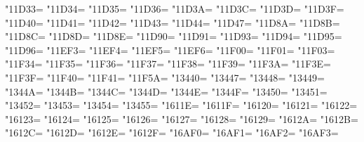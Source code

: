 \XeTeXcharclass"11D33=\KclassCM
\XeTeXcharclass"11D34=\KclassCM
\XeTeXcharclass"11D35=\KclassCM
\XeTeXcharclass"11D36=\KclassCM
\XeTeXcharclass"11D3A=\KclassCM
\XeTeXcharclass"11D3C=\KclassCM
\XeTeXcharclass"11D3D=\KclassCM
\XeTeXcharclass"11D3F=\KclassCM
\XeTeXcharclass"11D40=\KclassCM
\XeTeXcharclass"11D41=\KclassCM
\XeTeXcharclass"11D42=\KclassCM
\XeTeXcharclass"11D43=\KclassCM
\XeTeXcharclass"11D44=\KclassCM
\XeTeXcharclass"11D47=\KclassCM
\XeTeXcharclass"11D8A=\KclassCM
\XeTeXcharclass"11D8B=\KclassCM
\XeTeXcharclass"11D8C=\KclassCM
\XeTeXcharclass"11D8D=\KclassCM
\XeTeXcharclass"11D8E=\KclassCM
\XeTeXcharclass"11D90=\KclassCM
\XeTeXcharclass"11D91=\KclassCM
\XeTeXcharclass"11D93=\KclassCM
\XeTeXcharclass"11D94=\KclassCM
\XeTeXcharclass"11D95=\KclassCM
\XeTeXcharclass"11D96=\KclassCM
\XeTeXcharclass"11EF3=\KclassCM
\XeTeXcharclass"11EF4=\KclassCM
\XeTeXcharclass"11EF5=\KclassCM
\XeTeXcharclass"11EF6=\KclassCM
\XeTeXcharclass"11F00=\KclassCM
\XeTeXcharclass"11F01=\KclassCM
\XeTeXcharclass"11F03=\KclassCM
\XeTeXcharclass"11F34=\KclassCM
\XeTeXcharclass"11F35=\KclassCM
\XeTeXcharclass"11F36=\KclassCM
\XeTeXcharclass"11F37=\KclassCM
\XeTeXcharclass"11F38=\KclassCM
\XeTeXcharclass"11F39=\KclassCM
\XeTeXcharclass"11F3A=\KclassCM
\XeTeXcharclass"11F3E=\KclassCM
\XeTeXcharclass"11F3F=\KclassCM
\XeTeXcharclass"11F40=\KclassCM
\XeTeXcharclass"11F41=\KclassCM
\XeTeXcharclass"11F5A=\KclassCM
\XeTeXcharclass"13440=\KclassCM
\XeTeXcharclass"13447=\KclassCM
\XeTeXcharclass"13448=\KclassCM
\XeTeXcharclass"13449=\KclassCM
\XeTeXcharclass"1344A=\KclassCM
\XeTeXcharclass"1344B=\KclassCM
\XeTeXcharclass"1344C=\KclassCM
\XeTeXcharclass"1344D=\KclassCM
\XeTeXcharclass"1344E=\KclassCM
\XeTeXcharclass"1344F=\KclassCM
\XeTeXcharclass"13450=\KclassCM
\XeTeXcharclass"13451=\KclassCM
\XeTeXcharclass"13452=\KclassCM
\XeTeXcharclass"13453=\KclassCM
\XeTeXcharclass"13454=\KclassCM
\XeTeXcharclass"13455=\KclassCM
\XeTeXcharclass"1611E=\KclassCM
\XeTeXcharclass"1611F=\KclassCM
\XeTeXcharclass"16120=\KclassCM
\XeTeXcharclass"16121=\KclassCM
\XeTeXcharclass"16122=\KclassCM
\XeTeXcharclass"16123=\KclassCM
\XeTeXcharclass"16124=\KclassCM
\XeTeXcharclass"16125=\KclassCM
\XeTeXcharclass"16126=\KclassCM
\XeTeXcharclass"16127=\KclassCM
\XeTeXcharclass"16128=\KclassCM
\XeTeXcharclass"16129=\KclassCM
\XeTeXcharclass"1612A=\KclassCM
\XeTeXcharclass"1612B=\KclassCM
\XeTeXcharclass"1612C=\KclassCM
\XeTeXcharclass"1612D=\KclassCM
\XeTeXcharclass"1612E=\KclassCM
\XeTeXcharclass"1612F=\KclassCM
\XeTeXcharclass"16AF0=\KclassCM
\XeTeXcharclass"16AF1=\KclassCM
\XeTeXcharclass"16AF2=\KclassCM
\XeTeXcharclass"16AF3=\KclassCM
